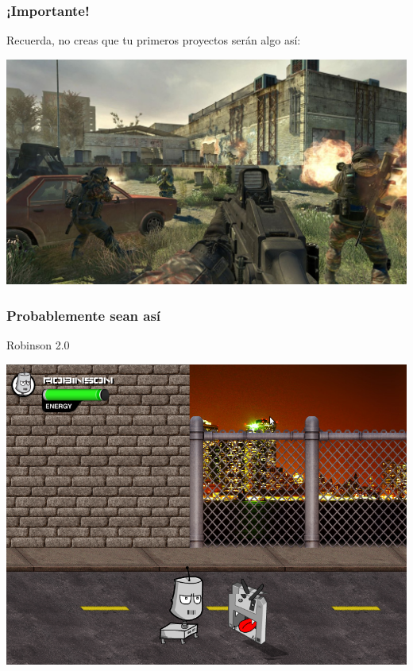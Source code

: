 \begin{frame}
	\frametitle{¡Importante!}
	
	\begin{center}
		Recuerda, no creas que tu primeros proyectos serán algo así:
	\end{center}	
	
	\begin{center}
		\includegraphics[scale=0.2]{img/codmw2.jpg}
	\end{center}	
\end{frame}


\begin{frame}
	\frametitle{Probablemente sean así}

	\begin{center}
	Robinson 2.0
	
	    \includegraphics[scale=0.3]{img/robinson.png}
	\end{center}
\end{frame}

